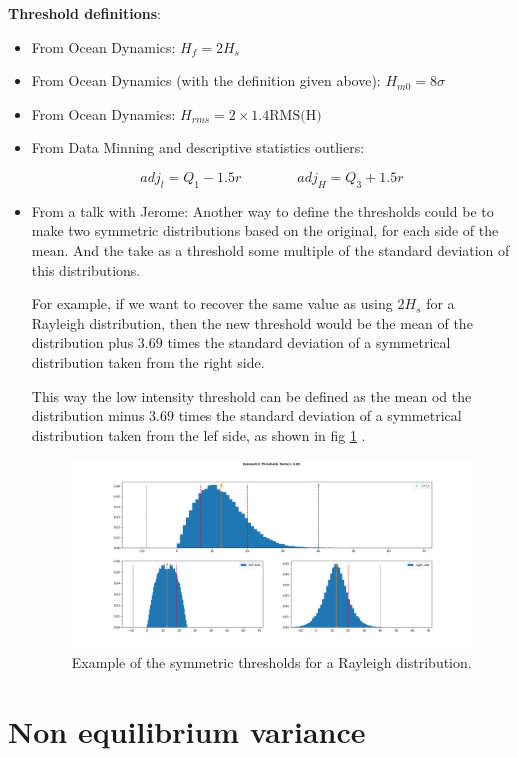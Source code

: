 \textbf{Threshold definitions}:
\begin{itemize}
	\item From Ocean Dynamics: $H_f=2H_s $
	\item From Ocean Dynamics (with the definition given above): $H_{m0}=8\sigma$
	\item From Ocean Dynamics: $H_{rms}=2\times 1.4 \text{RMS(H)}$
	\item From Data Minning and descriptive statistics outliers:
	
	$$adj_l=Q_1-1.5r \qquad \qquad adj_H=Q_3+1.5r$$
	
	\item From a talk with Jerome: Another way to define the thresholds could be to make two symmetric distributions based on the original, for each side of the mean. And the take as a threshold some multiple of the standard deviation of this distributions. 
	
	For example, if we want to recover the same value as using $2H_s$ for a Rayleigh distribution, then the new threshold would be the mean of the distribution plus \textbf{$3.69$} times the standard deviation of a symmetrical distribution taken from the right side. 
	
	This way the low intensity threshold can be defined as  the mean od the distribution minus \textbf{$3.69$} times the standard deviation of a symmetrical distribution taken from the lef side, as shown in fig \ref{fig:symthreshrayl} . 
	
	\begin{figure}
		\centering
		\includegraphics[width=0.8\linewidth]{Images/Metrics/sym_thresh_rayl}
		\caption{Example of the symmetric thresholds for a Rayleigh distribution.}
		\label{fig:symthreshrayl}
	\end{figure}
	
\end{itemize}	

\section{Non equilibrium variance}
\label{apx:variance_contradiction}

